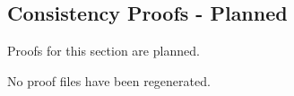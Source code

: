\subsection*{Consistency Proofs - Planned}

Proofs for this section are planned.

No proof files have been regenerated.
